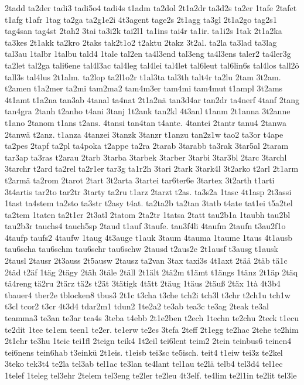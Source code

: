 {2tadd
ta2der
tadi3
tadi5o4
tadi4s
t1adm
ta2dol
2t1a2dr
ta3d2s
ta2er
1tafe
2tafet
t1afg
t1afr
1tag
ta2ga
ta2g1e2i
4t3agent
tage2s
2t1agg
ta3gl
2t1a2go
tag2s1
tag4san
tag4st
2tah2
3tai
ta3i2k
tai2l1
ta1ins
tai4r
ta1ir.
ta1i2s
1tak
2t1a2ka
ta3kes
2t1akk
ta2kro
2taks
tak2t1o2
t2aktu
2takz
3t2al.
ta2la
ta3lad
ta3lag
tal3au
1talbr
1talbu
tald4
1tale
tal2en
ta4l3end
tal3eng
ta4l3ens
taler2
ta4ler3g
ta2let
tal2ga
tali6ene
tal4l3ac
tal4leg
tal4lei
tal4let
tal6leut
tal6lin6s
tal4los
tall2ö
tall3s
tal4lus
2t1alm.
ta2lop
ta2l1o2r
t1al3ta
tal3th
talt4r
ta2lu
2tam
3t2am.
t2amen
t1a2mer
ta2mi
tam2ma2
tam4m3er
tam4mi
tam4mut
t1ampl
3t2ams
4t1amt
t1a2na
tan3ab
4tanal
ta4nat
2t1a2nä
tan3d4ar
tan2dr
ta4nerf
4tanf
2tang
tan4gra
2tanh
t2anho
t4ani
3tanj
1t2ank
tan2kl
4t3anl
t1anm
2t1anna
3t2anne
t1ano
2tanom
t1ans
t2ans.
4tansi
tan4tan
t4ante.
4tantei
2tantr
tanu4
2tanwa
2tanwä
t2anz.
t1anza
4tanzei
3tanzk
3tanzr
t1anzu
tan2z1w
tao2
ta3or
t4ape
ta2pes
2tapf
ta2pl
ta4poka
t2appe
ta2ra
2tarab
3tarabb
ta3rak
3tar5al
2taram
tar3ap
ta3ras
t2arau
2tarb
3tarba
3tarbek
3tarber
3tarbi
3tar3bl
2tarc
3tarchl
3tarchr
t2ard
ta2rel
ta2r1er
tar3g
ta1r2h
3tari
2tark
3tark4l
3t2arko
t2arl
2t1arm
t2armä
ta2rom
2tarot
2tart
3t2arta
3tartei
tar6ter6e
3tartex
3t2arth
t1arti
3t4artis
tar2to
tar2tr
3tarty
ta2ru
t1arz
2tarzt
t2as.
ta3s2a
1tasc
4t1asp
2t3assi
1tast
ta4stem
ta2sto
ta3str
t2asy
t4at.
ta2ta2b
ta2tan
3tatb
t4ate
tat1ei
t5a2tel
ta2tem
1taten
ta2t1er
2t3atl
2tatom
2ta2tr
1tatsa
2tatt
tau2b1a
1taubh
tau2bl
tau2b3r
tauchs4
tauch5sp
2taud
t1auf
3taufe.
tau3f4li
4taufm
2taufn
t3au2f1o
4taufp
taufs2
4taufw
1taug
4t3auge
t1auk
3taum
4tauma
1taume
1taus
4t1ausb
tau6scha
tau6schm
tau6schr
tau6schw
2tausd
t2aus2e
2t1ausf
t3ausg
t1ausk
2tausl
2tausr
2t3auss
2t5ausw
2tausz
ta2van
3tax
taxi3s
4t1axt
2tää
2täb
tä1c
2täd
t2äf
1täg
2tägy
2täh
3täle
2täll
2t1ält
2tä2m
t1ämt
t1ängs
1tänz
2t1äp
2täq
tä4reng
tä2ru
2tärz
tä2s
t2ät
3tätigk
4tätt
2täug
1täus
2täuß
2täx
1tà
4t3b4
tbauer4
tber2e
tblocken8
tbus3
2t1c
t3cha
t3che
tch2i
tch3l
t3chr
t2ch1u
tch1w
t3cl
tcor2
t3cr
4t3d4
tdar2m1
tdun2
1te2a2
te3ab
tea3c
te3ag
2teak
te3al
teamma3
te3an
te3ar
tea4s
3teba
t4ebb
2t1e2ben
t2ech
1techn
te2chu
2teck
t1ecu
te2dit
1tee
te1em
teen1
te2er.
te1erw
te2es
3tefa
2teff
2t1egg
te2hac
2tehe
te2him
2t1ehr
te3hu
1teic
tei1fl
2teign
teik4
1t2eil
tei6lent
teim2
2tein
teinbus6
teinen4
tei6nens
tein6hab
t3einkü
2t1eis.
t1eisb
tei3sc
te5isch.
teit4
t1eiw
tei3z
te2kel
3teko
tek3t4
te2la
tel3ab
tel1ac
te3lan
te4lant
tel1au
te2lä
telb4
tel3d4
tel1ec
1telef
1teleg
tel3ehr
2telem
tel3eng
te2ler
te2leu
4t3elf.
te4lim
te2l1in
te2lit
tel3le
}
